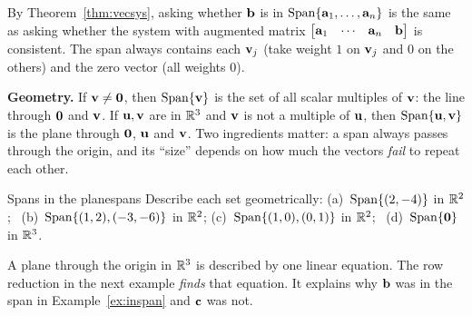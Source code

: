 \documentclass[11pt]{article}
\begin{document}
By Theorem~\ref{thm:vecsys}, asking whether $\mathbf{b}$ is in $\operatorname{Span}\{\mathbf{a}_1,\dots,\mathbf{a}_n\}$ is the same as asking whether
the system with augmented matrix $\begin{bmatrix}\mathbf{a}_1&\cdots&\mathbf{a}_n&\mathbf{b}\end{bmatrix}$ is consistent.
The span always contains each $\mathbf{v}_j$ (take weight $1$ on $\mathbf{v}_j$ and $0$ on the others) and the zero vector (all
weights $0$).

\textbf{Geometry.} If $\mathbf{v}\neq\mathbf{0}$, then $\operatorname{Span}\{\mathbf{v}\}$ is the set of all scalar multiples of $\mathbf{v}$: the line through
$\mathbf{0}$ and $\mathbf{v}$. If $\mathbf{u},\mathbf{v}$ are in $\mathbb{R}^3$ and $\mathbf{v}$ is not a multiple of $\mathbf{u}$, then
$\operatorname{Span}\{\mathbf{u},\mathbf{v}\}$ is the plane through $\mathbf{0}$, $\mathbf{u}$ and $\mathbf{v}$. Two ingredients matter: a span always passes
through the origin, and its ``size'' depends on how much the vectors \emph{fail} to repeat each other.

\begin{kc}{Spans in the plane}{spans}
Describe each set geometrically: (a)~$\operatorname{Span}\{(2,-4)\}$ in $\mathbb{R}^2$; \ (b)~$\operatorname{Span}\{(1,2),(-3,-6)\}$ in $\mathbb{R}^2$;
(c)~$\operatorname{Span}\{(1,0),(0,1)\}$ in $\mathbb{R}^2$; \ (d)~$\operatorname{Span}\{\mathbf{0}\}$ in $\mathbb{R}^3$.
\end{kc}

A plane through the origin in $\mathbb{R}^3$ is described by one linear equation. The row reduction in the next example
\emph{finds} that equation. It explains why $\mathbf{b}$ was in the span in Example~\ref{ex:inspan} and $\mathbf{c}$ was not.
\end{document}
